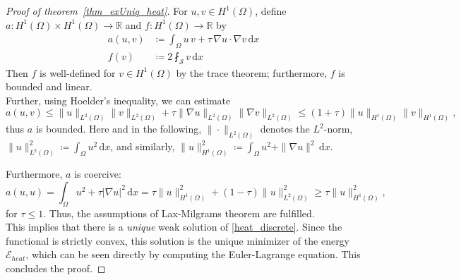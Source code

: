 \documentclass[12pt,openany]{book}
\newcommand{\R}{\mathbb{R}}
\def\S{\mathcal{S}}
\theoremstyle{plainnormal}
\theoremstyle{remark}
\begin{document}
\begin{proof}[Proof of theorem~\ref{thm_exUniq_heat}]
    For $u,v \in H^1(\Omega)$, define $a: H^1(\Omega)\times H^1(\Omega) \rightarrow \R$ and $f: H^1(\Omega) \rightarrow\R$ by 
    \begin{align*}
        a(u,v) &\coloneqq \int_\Omega u\,v + \tau \,\nabla u\cdot\nabla v \,\mathrm{d}x\\
        f(v) & \coloneqq 2\fint_\S v \,\mathrm{d}x 
    \end{align*}
    Then $f$ is well-defined for $v \in H^1(\Omega)$ by the trace theorem; furthermore, $f$ is bounded and linear.\\
    Further, using Hoelder's inequality, we can estimate  $$a(u,v) \leq \|u\|_{L^2(\Omega)}\|v\|_{L^2(\Omega)} + \tau \|\nabla u\|_{L^2(\Omega)}\|\nabla v\|_{L^2(\Omega)} \leq (1 + \tau) \|u\|_{H^1(\Omega)}\|v\|_{H^1(\Omega)},$$ thus $a$ is bounded. Here and in the following, $\|\cdot\|_{L^2(\Omega)}$ denotes the $L^2$-norm, $\|u\|^2_{L^2(\Omega)} \coloneqq \int_\Omega u^2\, \mathrm{d}x$, and similarly, $\|u\|^2_{H^1(\Omega)} \coloneqq \int_\Omega u^2 + \|\nabla u\|^2\, \mathrm{d}x$. \par
    Furthermore, $a$ is coercive:  $$a(u,u) = \int_\Omega u^2 + \tau |\nabla u|^2 \,\mathrm{d}x = \tau \|u\|^2_{H^1(\Omega)} + (1-\tau) \|u\|^2_{L^2(\Omega)} \geq \tau \|u\|^2_{H^1(\Omega)},$$ for $\tau \leq 1$. Thus, the assumptions of Lax-Milgrams theorem are fulfilled. \\
    This implies that there is a \emph{unique} weak solution of \cref{heat_discrete}. Since the functional is strictly convex, this solution is the unique minimizer of the energy $\mathcal{E}_{heat}$, which can be seen directly by computing the Euler-Lagrange equation. This concludes the proof.
\end{proof}
\end{document}
